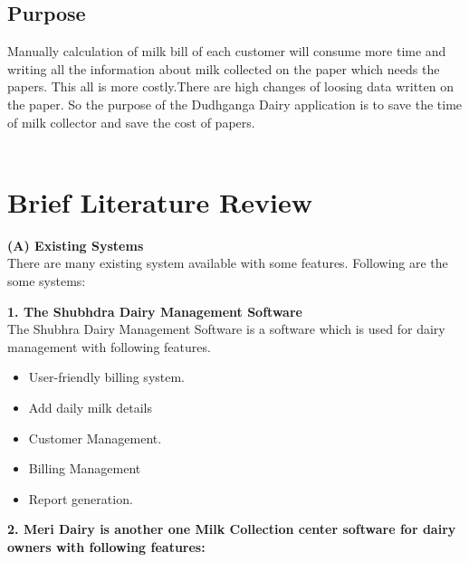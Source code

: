 \documentclass[english]{article}
\begin{document}
\subsection{Purpose}
Manually calculation of milk bill of each customer will consume more time and writing all the information about milk collected on the paper which needs the papers. This all is more costly.There are high changes of loosing data written on the paper. So the purpose of the Dudhganga Dairy application is to save the time of milk collector and save the cost of papers.
\\\
\clearpage
\section{ Brief Literature Review} %
\textbf{(A)	Existing Systems} \\
There are many existing system available with some features. Following are the some systems:
\item \textbf{1. The Shubhdra Dairy Management Software}\\
The Shubhra Dairy Management Software is a software which is used for dairy management with following features.
\begin{itemize}
\item  User-friendly billing system.
\item  Add daily milk details
\item Customer Management.
\item Billing Management
\item Report generation.

\end{itemize}
\item \textbf{2. Meri Dairy is another one Milk Collection center software for dairy owners with following features:}
\end{document}

